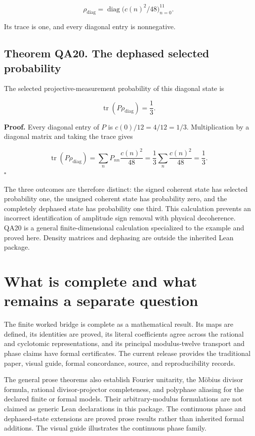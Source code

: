 \[
\rho_{\mathrm{diag}}=\operatorname{diag}\big(c(n)^2/48\big)_{n=0}^{11}.
\]

Its trace is one, and every diagonal entry is nonnegative.

\hypertarget{q:theorem-qa20.-the-dephased-selected-probability}{%
\subsection*{Theorem QA20. The dephased selected
probability}\label{q:theorem-qa20.-the-dephased-selected-probability}}

The selected projective-measurement probability of this diagonal state
is

\[
\operatorname{tr}(P\rho_{\mathrm{diag}})=\frac13.
\]

\textbf{Proof.} Every diagonal entry of \(P\) is \(c(0)/12=4/12=1/3\).
Multiplication by a diagonal matrix and taking the trace gives

\[
\operatorname{tr}(P\rho_{\mathrm{diag}})
=\sum_n P_{nn}\frac{c(n)^2}{48}
=\frac13\sum_n\frac{c(n)^2}{48}
=\frac13.
\] \(\square\)

The three outcomes are therefore distinct: the signed coherent state has
selected probability one, the unsigned coherent state has probability
zero, and the completely dephased state has probability one third. This
calculation prevents an incorrect identification of amplitude sign
removal with physical decoherence. QA20 is a general finite-dimensional
calculation specialized to the example and proved here. Density matrices
and dephasing are outside the inherited Lean package.

\hypertarget{q:what-is-complete-and-what-remains-a-separate-question}{%
\section{What is complete and what remains a separate
question}\label{q:what-is-complete-and-what-remains-a-separate-question}}

The finite worked bridge is complete as a mathematical result. Its maps
are defined, its identities are proved, its literal coefficients agree
across the rational and cyclotomic representations, and its principal
modulus-twelve transport and phase claims have formal certificates. The current release provides the traditional paper, visual
guide, formal concordance, source, and reproducibility records.

The general prose theorems also establish Fourier unitarity, the Möbius
divisor formula, rational divisor-projector completeness, and polyphase
aliasing for the declared finite or formal models. Their
arbitrary-modulus formulations are not claimed as generic Lean
declarations in this package. The continuous phase and dephased-state
extensions are proved prose results rather than inherited formal
additions. The visual guide illustrates the continuous phase family.

